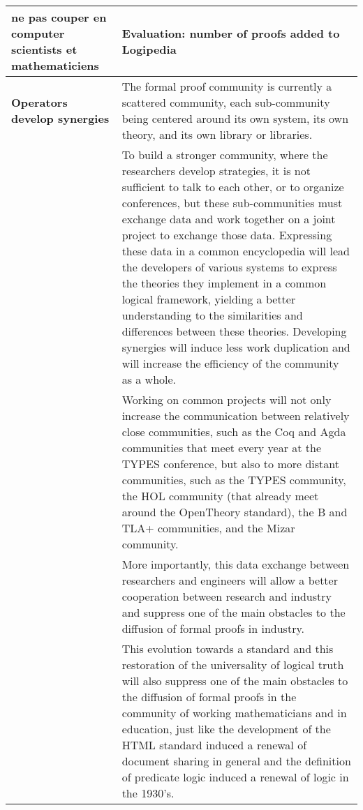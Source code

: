 \begin{longtable}{|p{}|p{}|}
{\color{red} ne pas couper en computer scientists et mathematiciens}


&
\begin{framed}
  {\color{red} Evaluation: number of proofs added to Logipedia}
\end{framed}\\

\hline
{\bf Operators develop synergies}
&
The formal proof community is currently a scattered community, each
sub-community being centered around its own system, its own theory,
and its own library or libraries.\\
&
\hspace{0.4cm}
To build a stronger community, where the researchers develop
strategies, it is not sufficient to talk to each other, or to organize
conferences, but these sub-communities must exchange data and work
together on a joint project to exchange those data.
Expressing these data in a common encyclopedia will
lead the developers of various systems to express the theories they
implement in a common logical framework, yielding a better understanding
to the similarities and differences between these theories.
Developing synergies will induce less work duplication and will increase
the efficiency of the community as a whole.\\
&
\hspace{0.4cm}
Working on common projects will not only increase the communication
between relatively close communities, such as the Coq and
  Agda communities that meet every year at the TYPES conference, but
also to more distant communities, such as the TYPES community, the HOL
community (that already meet around the OpenTheory standard),
the B and TLA+ communities, and the Mizar community.\\
&
\hspace{0.4cm}
More importantly, this data exchange between researchers and
engineers will allow a better
cooperation between research and industry and suppress one of the main
obstacles to the diffusion of formal proofs in industry.\\
&
\hspace{0.4cm}
This evolution towards a standard and this restoration of the
universality of logical truth will also suppress one of the main
obstacles to the diffusion of formal proofs in the community of
working mathematicians and in education, just like the development
of the HTML standard induced a renewal of document sharing in general
and the definition of predicate logic induced a renewal of logic in
the 1930's.\\

\end{longtable}

